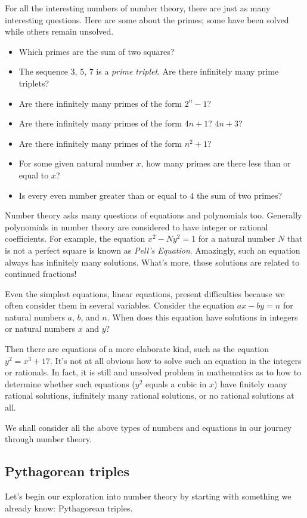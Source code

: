   For all the interesting numbers of number theory, there are just as many
  interesting questions. Here are some about the primes; some have been solved
  while others remain unsolved.
  \begin{itemize}
	  \item Which primes are the sum of two squares?
	  \item The sequence \(3\), \(5\), \(7\) is a \emph{prime triplet}. Are
		  there infinitely many prime triplets?
	  \item Are there infinitely many primes of the form \(2^n-1\)?
	  \item Are there infinitely many primes of the form \(4n+1\)? \(4n+3\)?
	  \item Are there infinitely many primes of the form \(n^2+1\)?
	  \item For some given natural number \(x\), how many primes are there
		  less than or equal to \(x\)?
	  \item Is every even number greater than or equal to \(4\) the sum of two primes?
  \end{itemize}
  Number theory asks many questions of equations and polynomials too. Generally
  polynomials in number theory are considered to have integer or rational coefficients.
  For example, the equation \(x^2-Ny^2=1\) for a natural number \(N\) that is not a perfect
  square is known as \emph{Pell's Equation}. Amazingly, such an equation always
  has infinitely many solutions. What's more, those solutions are related to continued fractions!

  Even the simplest equations, linear equations, present difficulties because we often
  consider them in several variables. Consider the equation \(ax-by=n\) for natural numbers
  \(a\), \(b\), and \(n\). When does this equation have solutions in integers or natural numbers \(x\)
  and \(y\)?

  Then there are equations of a more elaborate kind, such as the equation \(y^2=x^3+17\). It's not at all
  obvious how to solve such an equation in the integers or rationals. In fact, it is still
  and unsolved problem in mathematics as to how to determine whether such equations (\(y^2\) equals
  a cubic in \(x\)) have finitely many rational solutions, infinitely many rational solutions, or no rational
  solutions at all.

  We shall consider all the above types of numbers and equations in our journey through number theory.
  \subsection*{Pythagorean triples}
  Let's begin our exploration into number theory by starting with something
  we already know: Pythagorean triples.

